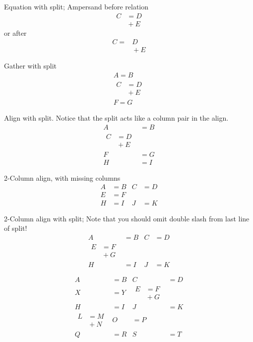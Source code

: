 \documentclass[a4paper]{book}
\begin{document}
Equation with split; Ampersand before relation
\begin{equation}
\begin{split}
C &= D \\
&{}+E
\end{split}
\end{equation}
or after
\begin{equation}
\begin{split}
C =& D \\
&{}+E
\end{split}
\end{equation}

Gather with split
\begin{gather}
A = B \\
\begin{split}
C &= D \\
&{}+E
\end{split}\\
 F = G
\end{gather}

Align with split.
Notice that the split acts like a column pair in the align.
\begin{align}
A &= B \\
\begin{split}
C &= D \\
&{}+E
\end{split}\\
 F &= G\\
H &= I
\end{align}

2-Column align, with missing columns
\begin{align}
  A &= B &
 C &= D \\
  E &= F \\
  H &=  I &
  J &= K
\end{align}

2-Column align with split;
Note that you should omit double slash from last line of split!
\begin{align}
  A &= B &
 C &= D \\
\begin{split}
  E &= F \\
    &{} + G
\end{split}\\
  H &=  I &
  J &= K
\end{align}

\begin{align}
  A &= B &
  C &= D \\
  X &= Y &
\begin{split}
  E &= F \\
    &{} + G
\end{split}\\
  H &=  I & J &= K \\
  \begin{split}
    L &= M\\
    &{}+N
  \end{split} &
 O &= P\\
  Q &= R &
  S &= T
\end{align}
\end{document}
